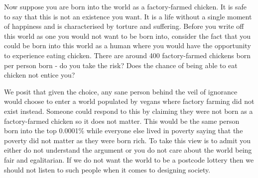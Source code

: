 Now suppose you are born into the world as a factory-farmed chicken. It is safe to say that this is not an existence you want. It is a life without a single moment of happiness and is characterised by torture and suffering. Before you write off this world as one you would not want to be born into, consider the fact that you could be born into this world as a human where you would have the opportunity to experience eating chicken. There are around 400 factory-farmed chickens born per person born - do you take the risk? Does the chance of being able to eat chicken not entice you?

We posit that given the choice, any sane person behind the veil of ignorance would choose to enter a world populated by vegans where factory farming did not exist instead. Someone could respond to this by claiming they were not born as a factory-farmed chicken so it does not matter. This would be the same person born into the top 0.0001\% while everyone else lived in poverty saying that the poverty did not matter as they were born rich. To take this view is to admit you either do not understand the argument or you do not care about the world being fair and egalitarian. If we do not want the world to be a postcode lottery then we should not listen to such people when it comes to designing society.